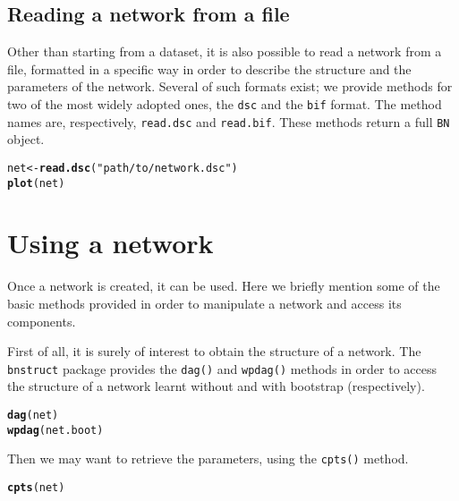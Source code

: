 \documentclass{article}\usepackage[]{graphicx}\usepackage[]{color}
\makeatletter
\newcommand{\hlstr}[1]{\textcolor[rgb]{0.192,0.494,0.8}{#1}}%
\newcommand{\hlstd}[1]{\textcolor[rgb]{0.345,0.345,0.345}{#1}}%
\newcommand{\hlkwb}[1]{\textcolor[rgb]{0.69,0.353,0.396}{#1}}%
\newcommand{\hlkwd}[1]{\textcolor[rgb]{0.737,0.353,0.396}{\textbf{#1}}}%
\newenvironment{kframe}{%
 \def\at@end@of@kframe{}%
 \ifinner\ifhmode%
  \def\at@end@of@kframe{\end{minipage}}%
  \begin{minipage}{\columnwidth}%
 \fi\fi%
 \def\FrameCommand##1{\hskip\@totalleftmargin \hskip-\fboxsep
 \colorbox{shadecolor}{##1}\hskip-\fboxsep
     \hskip-\linewidth \hskip-\@totalleftmargin \hskip\columnwidth}%
 \MakeFramed {\advance\hsize-\width
   \@totalleftmargin\z@ \linewidth\hsize
   \@setminipage}}%
 {\par\unskip\endMakeFramed%
 \at@end@of@kframe}
\newenvironment{knitrout}{}{} %
\newcommand{\Robject}[1]{{\texttt{#1}}}
\newcommand{\Rpackage}[1]{{\texttt{#1}}}
\newcommand{\Rmethod}[1]{{\texttt{#1}}}
\makeatother
\begin{document}
\subsection{Reading a network from a file}
Other than starting from a dataset, it is also possible to read a network from a file, formatted in a specific way
in order to describe the structure and the parameters of the network. Several of such formats exist; we provide methods
for two of the most widely adopted ones, the \texttt{dsc} and the \texttt{bif} format. The method names are, respectively,
\Rmethod{read.dsc} and \Rmethod{read.bif}. These methods return a full \Robject{BN} object.

\begin{knitrout}
\color{fgcolor}\begin{kframe}
\begin{alltt}
\hlstd{net} \hlkwb{<-} \hlkwd{read.dsc}\hlstd{(}\hlstr{"path/to/network.dsc"}\hlstd{)}
\hlkwd{plot}\hlstd{(net)}
\end{alltt}
\end{kframe}
\end{knitrout}


\section{Using a network}
Once a network is created, it can be used. Here we briefly mention some of the basic methods provided in order to
manipulate a network and access its components.

First of all, it is surely of interest to obtain the structure of a network. The \Rpackage{bnstruct} package
provides the \Rmethod{dag()} and \Rmethod{wpdag()} methods in order to access the structure of a network learnt without and
with bootstrap (respectively).
\begin{knitrout}
\color{fgcolor}\begin{kframe}
\begin{alltt}
\hlkwd{dag}\hlstd{(net)}
\hlkwd{wpdag}\hlstd{(net.boot)}
\end{alltt}
\end{kframe}
\end{knitrout}

Then we may want to retrieve the parameters, using the \Rmethod{cpts()} method.
\begin{knitrout}
\color{fgcolor}\begin{kframe}
\begin{alltt}
\hlkwd{cpts}\hlstd{(net)}
\end{alltt}
\end{kframe}
\end{knitrout}
\end{document}
